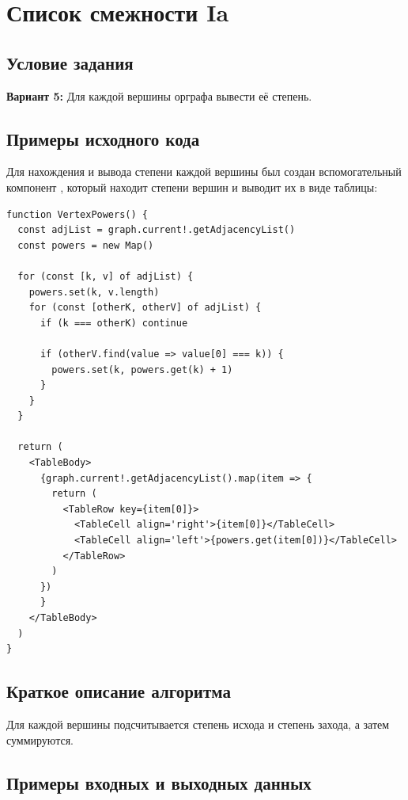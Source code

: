 \section{Список смежности Ia}
\subsection{Условие задания}
\textbf{Вариант 5:} Для каждой вершины орграфа вывести её степень.

\subsection{Примеры исходного кода}
Для нахождения и вывода степени каждой вершины был создан вспомогательный
компонент , который находит степени вершин и выводит
их в виде таблицы:
\begin{verbatim}
function VertexPowers() {
  const adjList = graph.current!.getAdjacencyList()
  const powers = new Map()

  for (const [k, v] of adjList) {
    powers.set(k, v.length)
    for (const [otherK, otherV] of adjList) {
      if (k === otherK) continue

      if (otherV.find(value => value[0] === k)) {
        powers.set(k, powers.get(k) + 1)
      }
    }
  }

  return (
    <TableBody>
      {graph.current!.getAdjacencyList().map(item => {
        return (
          <TableRow key={item[0]}>
            <TableCell align='right'>{item[0]}</TableCell>
            <TableCell align='left'>{powers.get(item[0])}</TableCell>
          </TableRow>
        )
      })
      }
    </TableBody>
  )
}
\end{verbatim}

\subsection{Краткое описание алгоритма}
Для каждой вершины подсчитывается степень исхода и степень захода,
а затем суммируются.

\subsection{Примеры входных и выходных данных}
